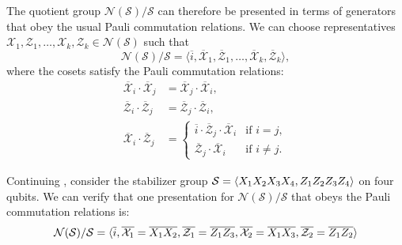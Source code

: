 The quotient group $\mathcal{N}(\mathcal{S})/\mathcal{S}$ can therefore be presented in terms of generators that obey the usual Pauli commutation relations.
We can choose representatives $\mathcal{X}_1, \mathcal{Z}_1, \ldots, \mathcal{X}_k, \mathcal{Z}_k \in \mathcal{N}(\mathcal{S})$ such that
\begin{equation}
    \mathcal{N}(\mathcal{S})/\mathcal{S} = \langle \overline{i}, \overline{\mathcal{X}}_1, \overline{\mathcal{Z}}_1, \ldots, \overline{\mathcal{X}}_k, \overline{\mathcal{Z}}_k \rangle,
\end{equation}
where the cosets satisfy the Pauli commutation relations:
\begin{align}
    \overline{\mathcal{X}}_i \cdot \overline{\mathcal{X}}_j &= \overline{\mathcal{X}}_j \cdot \overline{\mathcal{X}}_i, \\
    \overline{\mathcal{Z}}_i \cdot \overline{\mathcal{Z}}_j &= \overline{\mathcal{Z}}_j \cdot \overline{\mathcal{Z}}_i, \\
    \overline{\mathcal{X}}_i \cdot \overline{\mathcal{Z}}_j &=
    \begin{cases}
        \overline{i} \cdot \overline{\mathcal{Z}}_j \cdot \overline{\mathcal{X}}_i & \text{if } i = j, \\
        \overline{\mathcal{Z}}_j \cdot \overline{\mathcal{X}}_i & \text{if } i \neq j.
    \end{cases}
\end{align}

\begin{example}
    Continuing , consider the stabilizer group $\mathcal{S} = \langle X_1 X_2 X_3 X_4, Z_1 Z_2 Z_3 Z_4 \rangle$ on four qubits.
    We can verify that one presentation for $\mathcal{N(S)/S}$ that obeys the Pauli commutation relations is:
    \begin{equation}
        \mathcal{N(S)/S} = \langle
            \overline{i},
            \overline{\mathcal{X}_1} = \overline{X_1 X_2}, \overline{\mathcal{Z}_1} = \overline{Z_1 Z_3},
        \overline{\mathcal{X}_2} = \overline{X_1 X_3}, \overline{\mathcal{Z}_2} = \overline{Z_1 Z_2}
        \rangle
    \end{equation}
\end{example}

